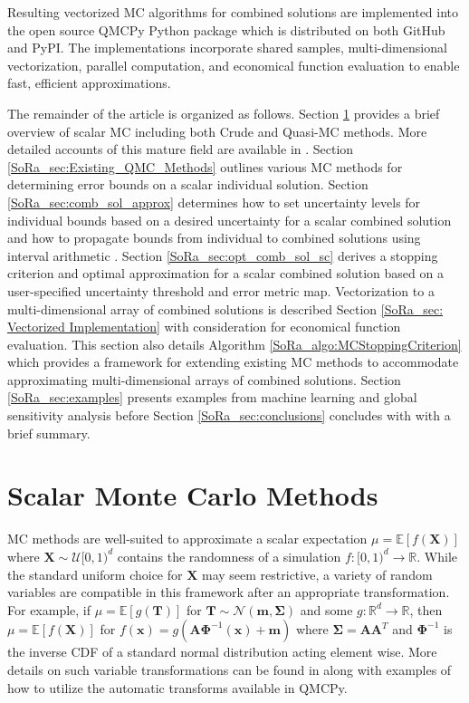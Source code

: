 \documentclass[graybox]{svmult}
\begin{document}
Resulting vectorized MC algorithms for combined solutions are implemented into the open source QMCPy Python package \cite{QMCPy} which is distributed on both GitHub and PyPI. The implementations incorporate shared samples, multi-dimensional vectorization, parallel computation, and economical function evaluation to enable fast, efficient approximations.

The remainder of the article is organized as follows. Section \ref{SoRa_sec:MCM} provides a brief overview of scalar MC including both Crude and Quasi-MC methods. More detailed accounts of this mature field are available in \cite{niederreiter1992random,mcbook}. Section \ref{SoRa_sec:Existing_QMC_Methods} outlines various MC methods for determining error bounds on a scalar individual solution. Section \ref{SoRa_sec:comb_sol_approx} determines how to set uncertainty levels for individual bounds based on a desired uncertainty for a scalar combined solution and how to propagate bounds from individual to combined solutions using interval arithmetic \cite{interval_analysis}. Section \ref{SoRa_sec:opt_comb_sol_sc} derives a stopping criterion and optimal approximation for a scalar combined solution based on a user-specified uncertainty threshold and error metric map. Vectorization to a multi-dimensional array of combined solutions is described Section \ref{SoRa_sec: Vectorized Implementation} with consideration for economical function evaluation. This section also details Algorithm \ref{SoRa_algo:MCStoppingCriterion} which provides a framework for extending existing MC methods to accommodate approximating multi-dimensional arrays of combined solutions. Section \ref{SoRa_sec:examples} presents examples from machine learning and global sensitivity analysis before Section \ref{SoRa_sec:conclusions} concludes with with a brief summary.   

\section{Scalar Monte Carlo Methods} \label{SoRa_sec:MCM}

MC methods are well-suited to approximate a scalar expectation $\mu = \mathbb{E}[f(\boldsymbol{X})]$ where $\boldsymbol{X} \sim \mathcal{U}[0,1)^d$ contains the randomness of a simulation $f: [0,1)^{d} \to \mathbb{R}$. While the standard uniform choice for $\boldsymbol{X}$ may seem restrictive, a variety of random variables are compatible in this framework after an appropriate transformation. For example, if $\mu = \mathbb{E}[g(\boldsymbol{T})]$ for $\boldsymbol{T} \sim \mathcal{N}(\boldsymbol{m},\boldsymbol{\Sigma})$ and some $g: \mathbb{R}^{d} \to \mathbb{R}$, then $\mu = \mathbb{E}[f(\boldsymbol{X})]$ for  $f(\boldsymbol{x})=g(\boldsymbol{A}\boldsymbol{\Phi}^{-1}(\boldsymbol{x})+\boldsymbol{m})$ where $\boldsymbol{\Sigma}=\boldsymbol{A}\boldsymbol{A}^T$ and $\boldsymbol{\Phi}^{-1}$ is the inverse CDF of a standard normal distribution acting element wise. More details on such variable transformations can be found in \cite{QMCSoftware} along with examples of how to utilize the automatic transforms available in QMCPy.
\end{document}
